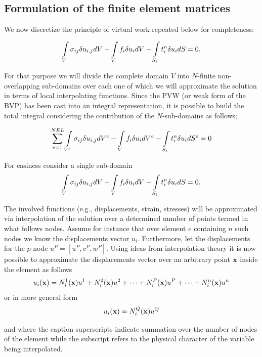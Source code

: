 \subsection{Formulation of the finite element matrices}
We now discretize the principle of virtual work repeated below for completeness:

\begin{equation} \label{pvw_2}
\int\limits_V \sigma_{ij} \delta u_{i,j} dV - \int\limits_V f_i \delta u_i dV - \int\limits_{S_t} t_i^n \delta u_i dS = 0.
\end{equation}

For that purpose we will divide the complete domain $V$ into $N$-finite non-overlapping sub-domains over each one of which we will approximate the solution in terms of local interpolating functions. Since the PVW (or weak form of the BVP) has been cast into an integral representation, it is possible to build the total integral considering the contribution of the $N$-sub-domains as follows;

\begin{equation}\label{pvw_dis}
\sum_{e=1}^{NEL} \int\limits_{V^e} \sigma_{ij} \delta u_{i,j} d{V^e} - \int\limits_V f_i \delta u_i d{V^e} - \int\limits_{S_t} t_i^n \delta u_id{S^e} = 0 
\end{equation}

For easiness consider a single sub-domain
\begin{equation} \label{pvw_sing}
\int\limits_V \sigma_{ij} \delta u_{i,j} dV - \int\limits_V f_i\delta u_idV - \int\limits_{S_t} t_i^n \delta u_i dS = 0.
\end{equation}

The involved functions (e.g., displacements, strain, stresses) will be approximated via interpolation of the solution over a determined number of points termed in what follows nodes. Assume for instance that over element $e$ containing $n$ such nodes we know the displacements vector $u_i$. Furthermore, let the displacements for the $p$-node $u^P=[u^P, v^P, w^P]$. Using ideas from interpolation theory it is now possible to approximate the displacements vector over an arbitrary point $\vb{x}$ inside the element as follows
\[u_i(\vb x) = N_i^1(\vb x)u^1 + N_i^2(\vb x)u^2 + \cdots + N_i^P(\vb x)u^P + \cdots + N_i^n(\vb x)u^n\]
or in more general form
\begin{equation} \label{bas_interpol}
{u_i}(\vb x) = N_i^Q(\vb x){u^Q}
\end{equation}

and where the caption superscripts indicate summation over the number of nodes of the element while the subscript refers to the physical character of the variable being interpolated.

